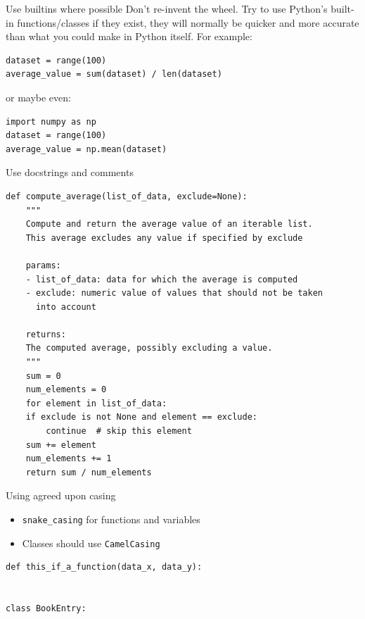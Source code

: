 \documentclass[10pt]{beamer}
\begin{document}
\begin{frame}[label={sec:org6c650cc},fragile]{Use builtins where possible}
 Don't re-invent the wheel. Try to use Python's built-in functions/classes if they
exist, they will normally be quicker and more accurate than what you could make in
Python itself. For example:

\begin{verbatim}
dataset = range(100)
average_value = sum(dataset) / len(dataset)
\end{verbatim}

or maybe even:

\begin{verbatim}
import numpy as np
dataset = range(100)
average_value = np.mean(dataset)
\end{verbatim}
\end{frame}

\begin{frame}[label={sec:org557aea6},fragile]{Use docstrings and comments}
 \begin{verbatim}
def compute_average(list_of_data, exclude=None):
    """
    Compute and return the average value of an iterable list. 
    This average excludes any value if specified by exclude

    params: 
    - list_of_data: data for which the average is computed 
    - exclude: numeric value of values that should not be taken 
      into account

    returns: 
    The computed average, possibly excluding a value.
    """
    sum = 0
    num_elements = 0
    for element in list_of_data:
	if exclude is not None and element == exclude:
	    continue  # skip this element
	sum += element
	num_elements += 1
    return sum / num_elements
\end{verbatim}
\end{frame}

\begin{frame}[label={sec:orgaae1bdf},fragile]{Using agreed upon casing}
 \begin{itemize}
\item \texttt{snake\_casing} for functions and variables
\item Classes should use \texttt{CamelCasing}
\end{itemize}

\begin{verbatim}
def this_if_a_function(data_x, data_y):


class BookEntry:
\end{verbatim}
\end{frame}
\end{document}
